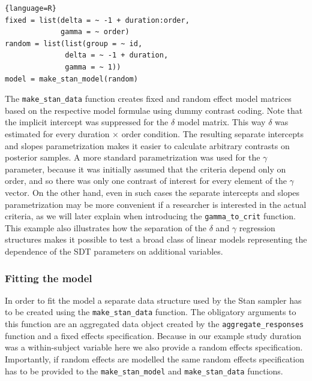 \documentclass[oneside,a4paper]{article}
\begin{document}
\begin{lstlisting}{language=R}
fixed = list(delta = ~ -1 + duration:order, 
             gamma = ~ order)
random = list(list(group = ~ id, 
              delta = ~ -1 + duration, 
              gamma = ~ 1))
model = make_stan_model(random)
\end{lstlisting}

The \texttt{make\_stan\_data} function creates fixed and random effect
model matrices based on the respective model formulae using dummy
contrast coding. Note that the implicit intercept was suppressed for
the $\delta$ model matrix. This way $\delta$ was estimated for every
duration $\times$ order condition. The resulting separate intercepts
and slopes parametrization makes it easier to calculate arbitrary
contrasts on posterior samples. A more standard parametrization was
used for the $\gamma$ parameter, because it was initially assumed that
the criteria depend only on order, and so there was only one contrast
of interest for every element of the $\gamma$ vector. On the other
hand, even in such cases the separate intercepts and slopes
parametrization may be more convenient if a researcher is interested
in the actual criteria, as we will later explain when introducing the
\texttt{gamma\_to\_crit} function. This example also illustrates how
the separation of the $\delta$ and $\gamma$ regression structures
makes it possible to test a broad class of linear models representing
the dependence of the SDT parameters on additional variables.

\subsubsection{Fitting the model}

In order to fit the model a separate data structure used by the Stan
sampler has to be created using the \texttt{make\_stan\_data}
function. The obligatory arguments to this function are an aggregated
data object created by the \texttt{aggregate\_responses} function and
a fixed effects specification. Because in our example study duration
was a within-subject variable here we also provide a random effects
specification. Importantly, if random effects are modelled the same
random effects specification has to be provided to the
\texttt{make\_stan\_model} and \texttt{make\_stan\_data} functions.
\end{document}
